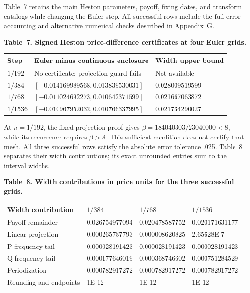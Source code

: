 \documentclass[11pt,a4paper]{article}
\begin{document}
Table~7 retains the main Heston parameters, payoff, fixing dates, and transform
catalogs while changing the Euler step. All successful rows include the full
error accounting and alternative numerical checks described in Appendix~G.

\noindent\textbf{Table~7. Signed Heston price-difference certificates at four Euler grids.}
\begin{center}
\begin{tabularx}{\textwidth}{@{}l X X@{}}
\toprule
Step & Euler minus continuous enclosure & Width upper bound \\
\midrule
\(1/192\) & No certificate: projection guard fails & Not available \\
\(1/384\) & \([-0.014169989568,0.013839530031]\) & 0.028009519599 \\
\(1/768\) & \([-0.011024692273,0.010642371599]\) & 0.021667063872 \\
\(1/1536\) & \([-0.010967952032,0.010766337995]\) & 0.021734290027 \\
\bottomrule
\end{tabularx}
\end{center}

At \(h=1/192\), the fixed projection proof gives
\(\beta=184040303/23040000<8\), while its recurrence requires \(\beta>8\).
This sufficient condition does not certify that mesh. All three successful
rows satisfy the absolute error tolerance .025. Table~8 separates their
width contributions; its exact unrounded entries sum to the interval widths.

\noindent\textbf{Table~8. Width contributions in price units for the three successful grids.}
\begin{center}
\begin{tabularx}{\textwidth}{@{}X X X X@{}}
\toprule
Width contribution & \(1/384\) & \(1/768\) & \(1/1536\) \\
\midrule
Payoff remainder & 0.026754977094 & 0.020478587752 & 0.020171631177 \\
Linear projection & 0.000265787793 & 0.000008620825 & 2.65628E-7 \\
P frequency tail & 0.000028191423 & 0.000028191423 & 0.000028191423 \\
Q frequency tail & 0.000177646019 & 0.000368746602 & 0.000751284529 \\
Periodization & 0.000782917272 & 0.000782917272 & 0.000782917272 \\
Rounding and endpoints & 1E-12 & 1E-12 & 1E-12 \\
\bottomrule
\end{tabularx}
\end{center}
\end{document}
